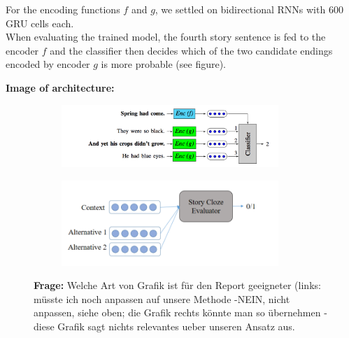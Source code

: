 \documentclass{article}
\begin{document}
For the encoding functions $f$ and $g$, we settled on bidirectional RNNs with 600 GRU cells each. \\[.1cm]
When evaluating the trained model, the fourth story sentence is fed to the encoder $f$ and the classifier then decides which of the two candidate endings encoded by encoder $g$ is more probable (see figure).


{\bf Image of architecture:}
\begin{figure}[h]
\begin{subfigure}[c]{0.5\textwidth}

\includegraphics[width=0.9\textwidth]{fig1_architecture}

\end{subfigure}
\begin{subfigure}[c]{0.4\textwidth}

\includegraphics[width=0.9\textwidth]{fig2_architecture}

\end{subfigure}
\caption{{\bf Frage: }Welche Art von Grafik ist für den Report geeigneter (links: m\"usste ich noch anpassen auf unsere Methode -NEIN, nicht anpassen, siehe oben; die Grafik rechts k\"onnte man so \"ubernehmen - diese Grafik sagt nichts relevantes ueber unseren Ansatz aus.}
\end{figure}
\end{document}
